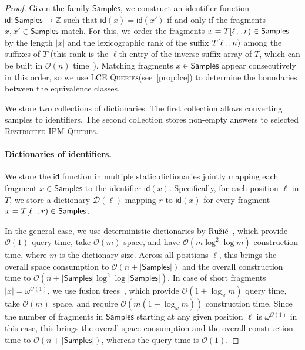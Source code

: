 \documentclass[a4paper]{article}
\theoremstyle{definition}
\theoremstyle{remark}
\newcommand{\RIPM}{\textsc{Restricted IPM Queries}\xspace}
\newcommand{\LCEQ}{\textsc{LCE Queries}\xspace}
\newcommand{\R}{\mathsf{Samples}}
\newcommand{\dd}{\mathinner{\ldotp\ldotp}}
\newcommand{\Oh}{\mathcal{O}}
\newcommand{\id}{\mathsf{id}}
\begin{document}
\begin{proof}
Given the family $\R$, we construct an identifier function $\id:\R\to\mathbb{Z}$ such that $\id(x)=\id(x')$ if and only if the fragments $x,x'\in \R$ match.
For this, we order the fragments $x=T[\ell\dd r)\in \R$ by the length $|x|$ and the lexicographic rank of the suffix $T[\ell\dd n)$ among the suffixes of $T$ (this rank is the $\ell$th entry of the inverse suffix array of $T$, which can be built in $\Oh(n)$ time~\cite{DBLP:journals/jacm/KarkkainenSB06}).
Matching fragments $x\in\R$ appear consecutively in this order, so we use \LCEQ (see~\cref{prop:lce}) to determine the boundaries between the equivalence classes.

We store two collections of dictionaries.
The first collection allows converting samples to identifiers.
The second collection stores non-empty answers to selected \RIPM.

\paragraph{Dictionaries of identifiers.}
We store the $\id$ function in multiple static dictionaries jointly mapping each fragment $x\in \R$  to the identifier $\id(x)$.
Specifically, for each position $\ell$ in $T$, we store a dictionary $\mathcal{D}(\ell)$ mapping $r$ to $\id(x)$
for every fragment $x=T[\ell \dd r)\in \R$. 

In the general case, we use deterministic dictionaries by Ružić~\cite{DBLP:conf/icalp/Ruzic08},
which provide $\Oh(1)$ query time, take $\Oh(m)$ space, and have $\Oh(m\log^2 \log m)$
construction time, where $m$ is the dictionary size. 
Across all positions $\ell$, this brings the overall space consumption to $\Oh(n+|\R|)$ and the overall construction time to $\Oh(n+|\R|\log^2 \log |\R|)$.
In case of short fragments $|x|=\omega^{\Oh(1)}$, we use fusion trees~\cite{DBLP:conf/focs/PatrascuT14},
which provide $\Oh(1+\log_\omega m)$ query time, take $\Oh(m)$ space, and require $\Oh(m(1+\log_\omega m))$
construction time. Since the number of fragments in $\R$
starting at any given position $\ell$ is $\omega^{\Oh(1)}$ in this case, this brings the overall space consumption and
the overall construction time to $\Oh(n+|\R|)$, whereas the query time is $\Oh(1)$.


\end{proof}
\end{document}
